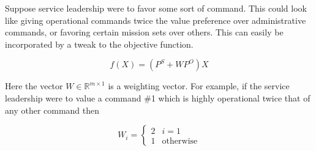 Suppose service leadership were to favor some sort of command. This could look like giving operational commands twice the value preference over administrative commands, or favoring certain mission sets over others. This can easily be incorporated by a tweak to the objective function. 

\[f(X) = (P^S + WP^O)X \]

Here the vector $W \in \mathbb{R}^{m \times 1}$ is a weighting vector. For example, if the service leadership were to value a command \#1 which is highly operational twice that of any other command then

\[ W_i = \begin{cases} 2 & i = 1\\ 1 & \text{otherwise} \end{cases}\] 
